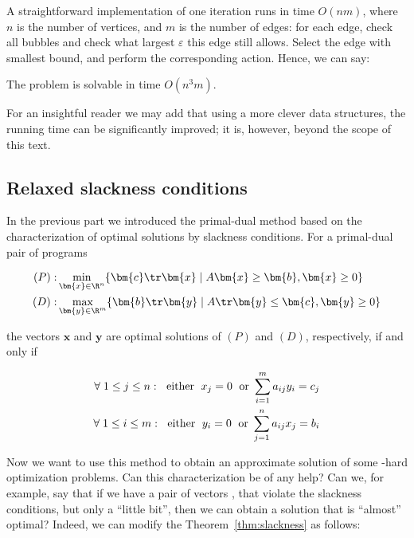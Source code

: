 \noindent
A straightforward implementation of one iteration runs in time $O(nm)$, where $n$ is the number of vertices, and $m$
is the number of edges: for each edge, check all bubbles and check what largest $\varepsilon$ this edge still allows.
Select the edge with smallest bound, and perform the corresponding action. Hence, we can say:

\begin{veta}
  The \minfactor problem is solvable in time $O(n^3m)$.
\end{veta}

\noindent
For an insightful reader we may add that using a more clever data structures, the running time can be significantly
improved; it is, however, beyond the scope of this text.



\subsection*{Relaxed slackness conditions}


\noindent
In the previous part we introduced the primal-dual method based on the characterization of optimal solutions
by slackness conditions. For a  primal-dual pair of programs

\begin{eqnarray*}
  (P):&\min\limits_{\bm{x}\in\R^n}\{\bm{c}\tr\bm{x}\mid A\bm{x}\ge\bm{b}, \bm{x}\ge 0\}\\
  (D):&\max\limits_{\bm{y}\in\R^m}\{\bm{b}\tr\bm{y}\mid A\tr\bm{y}\le\bm{c}, \bm{y}\ge 0\}
\end{eqnarray*}

\noindent
the vectors $\bm{x}$ and $\bm{y}$ are optimal solutions of $(P)$ and $(D)$, respectively, if and only if

\begin{eqnarray*}
  \forall\;1\le j\le n:\;{\rm\ either\ }\; x_j=0\; {\rm\ or\ }\sum_{i=1}^ma_{ij}y_i=c_j\\
  \forall\;1\le i\le m:\;{\rm\ either\ }\; y_i=0\; {\rm\ or\ }\sum_{j=1}^na_{ij}x_j=b_i
\end{eqnarray*}

\noindent
Now we want to use this method to obtain an approximate solution of some \NP-hard optimization
problems. Can this characterization be of any help? Can we, for example, say that if we have a pair of
vectors ,  that violate the slackness conditions, but only a ``little bit'', then we can
obtain a solution that is ``almost'' optimal? Indeed, we can modify the Theorem~\ref{thm:slackness}
as follows:


